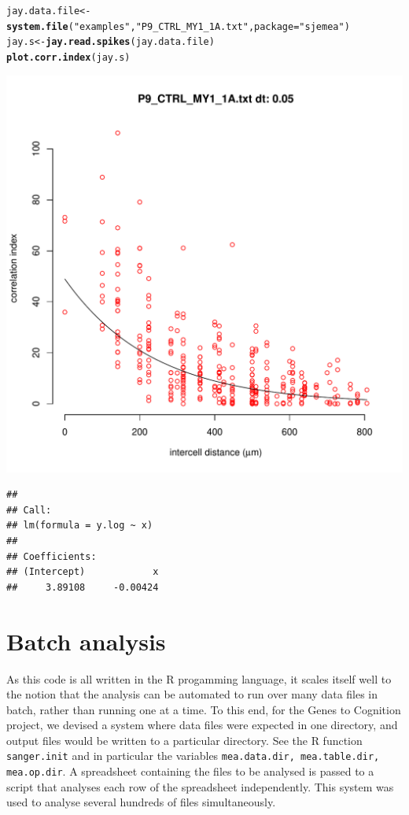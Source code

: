 \documentclass{article}\usepackage[]{graphicx}\usepackage[]{color}
\makeatletter
\def\maxwidth{ %
  \ifdim\Gin@nat@width>\linewidth
    \linewidth
  \else
    \Gin@nat@width
  \fi
}
\newcommand{\hlstr}[1]{\textcolor[rgb]{0.192,0.494,0.8}{#1}}%
\newcommand{\hlkwd}[1]{\textcolor[rgb]{0.737,0.353,0.396}{\textbf{#1}}}%
\newenvironment{kframe}{%
 \def\at@end@of@kframe{}%
 \ifinner\ifhmode%
  \def\at@end@of@kframe{\end{minipage}}%
  \begin{minipage}{\columnwidth}%
 \fi\fi%
 \def\FrameCommand##1{\hskip\@totalleftmargin \hskip-\fboxsep
 \colorbox{shadecolor}{##1}\hskip-\fboxsep
     \hskip-\linewidth \hskip-\@totalleftmargin \hskip\columnwidth}%
 \MakeFramed {\advance\hsize-\width
   \@totalleftmargin\z@ \linewidth\hsize
   \@setminipage}}%
 {\par\unskip\endMakeFramed%
 \at@end@of@kframe}
\newenvironment{knitrout}{}{} %
\makeatother
\begin{document}
\begin{knitrout}
\color{fgcolor}\begin{kframe}
\begin{alltt}
jay.data.file <- \hlkwd{system.file}(\hlstr{"examples"}, \hlstr{"P9_CTRL_MY1_1A.txt"}, package = \hlstr{"sjemea"})
jay.s <- \hlkwd{jay.read.spikes}(jay.data.file)
\hlkwd{plot.corr.index}(jay.s)
\end{alltt}


{\ttfamily\noindent\color{warningcolor}{\#\# Warning: removing 17 zero entries}}\end{kframe}
\includegraphics[width=\maxwidth]{figure/unnamed-chunk-3} 
\begin{kframe}\begin{verbatim}
## 
## Call:
## lm(formula = y.log ~ x)
## 
## Coefficients:
## (Intercept)            x  
##     3.89108     -0.00424
\end{verbatim}
\end{kframe}
\end{knitrout}


\section*{Batch analysis}

As this code is all written in the R progamming language, it scales
itself well to the notion that the analysis can be automated to run
over many data files in batch, rather than running one at a time.  To
this end, for the Genes to Cognition project, we devised a system
where data files were expected in one directory, and output files
would be written to a particular directory.  See the R function
\texttt{sanger.init} and in particular the variables
\texttt{mea.data.dir, mea.table.dir, mea.op.dir}.  A spreadsheet
containing the files to be analysed is passed to a script that
analyses each row of the spreadsheet independently.  This system was
used to analyse several hundreds of files simultaneously.
\end{document}

